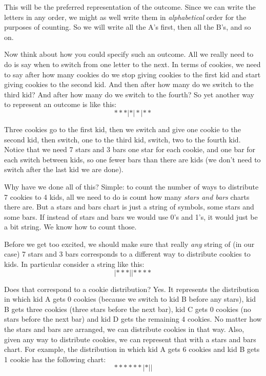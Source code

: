 \documentclass[10pt,]{book}
\theoremstyle{plain}
\theoremstyle{definition}
\theoremstyle{definition}
\theoremstyle{definition}
\numberwithin{equation}{chapter}
\begin{document}
This will be the preferred representation of the outcome. Since we can write the letters in any order, we might as well write them in \emph{alphabetical} order for the purposes of counting. So we will write all the A's first, then all the B's, and so on.
%
\par

Now think about how you could specify such an outcome. All we really need to do is say when to switch from one letter to the next. In terms of cookies, we need to say after how many cookies do we stop giving cookies to the first kid and start giving cookies to the second kid. And then after how many do we switch to the third kid? And after how many do we switch to the fourth? So yet another way to represent an outcome is like this:
\begin{equation*}
  ***|*|*|**
\end{equation*}
%
\par

Three cookies go to the first kid, then we switch and give one cookie to the second kid, then switch, one to the third kid, switch, two to the fourth kid. Notice that we need 7 stars and 3 bars \textendash{} one star for each cookie, and one bar for each switch between kids, so one fewer bars than there are kids (we don't need to switch after the last kid \textendash{} we are done).
%
\par

Why have we done all of this? Simple: to count the number of ways to distribute 7 cookies to 4 kids, all we need to do is count how many \emph{stars and bars} charts there are. But a stars and bars chart is just a string of symbols, some stars and some bars. If instead of stars and bars we would use 0's and 1's, it would just be a bit string. We know how to count those.
%
\par

Before we get too excited, we should make sure that really \emph{any} string of (in our case) 7 stars and 3 bars corresponds to a different way to distribute cookies to kids. In particular consider a string like this:
\begin{equation*}
  |***||****
\end{equation*}
%
\par

Does that correspond to a cookie distribution? Yes. It represents the distribution in which kid A gets 0 cookies (because we switch to kid B before any stars), kid B gets three cookies (three stars before the next bar), kid C gets 0 cookies (no stars before the next bar) and kid D gets the remaining 4 cookies. No matter how the stars and bars are arranged, we can distribute cookies in that way. Also, given any way to distribute cookies, we can represent that with a stars and bars chart. For example, the distribution in which kid A gets 6 cookies and kid B gets 1 cookie has the following chart:
\begin{equation*}
  ******|*||
\end{equation*}
%
\par
\end{document}
